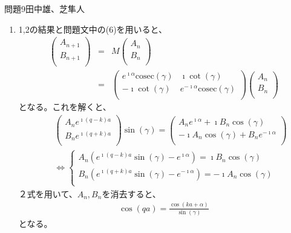 \documentclass[fleqn]{jbook}
\begin{document}
\begin{answer}{問題9}{田中雄、芝隼人}
\begin{enumerate}
\item
1,2の結果と問題文中の(6)を用いると、
\begin{eqnarray}
\left(
  \begin{array}{c}
    A_{n+1}   \\
    B_{n+1}   \\
  \end{array}
\right)
&=&M
\left(
  \begin{array}{c}
    A_{n}   \\
    B_{n}   \\
  \end{array}
\right)\\
&=&
\left(
  \begin{array}{cc}
    e^{\imath \alpha }\textrm{cosec} (\gamma )   & \imath \cot (\gamma )   \\
    -\imath \cot (\gamma )   & e^{-\imath \alpha }\textrm{cosec} (\gamma )   \\
  \end{array}
\right)
\left(
  \begin{array}{c}
    A_{n}   \\
    B_{n}   \\
  \end{array}
\right)
\end{eqnarray}
となる。これを解くと、
\begin{eqnarray}
&& \left(
  \begin{array}{c}
    A_{n}e^{\imath (q-k)a}   \\
    B_{n}e^{\imath (q+k)a}   \\
  \end{array}
\right)\sin(\gamma)
=
\left(
  \begin{array}{c}
    A_{n}e^{\imath \alpha}+\imath B_{n}\cos (\gamma)    \\
    -\imath A_{n}\cos (\gamma)+B_{n}e^{-\imath \alpha}  \\
  \end{array}
\right)\\
&& \Leftrightarrow  \left\{
  \begin{array}{c}
    A_{n}(e^{\imath (q-k)a}\sin (\gamma)-e^{\imath \alpha})=\imath B_{n}\cos (\gamma)   \\
    B_{n}(e^{\imath (q+k)a}\sin (\gamma)-e^{-\imath \alpha})=-\imath A_{n}\cos (\gamma)   \\
  \end{array}
\right.
\end{eqnarray}
２式を用いて、$A_{n},B_{n}$を消去すると、
\begin{eqnarray}
\cos (qa)=\frac{\cos (ka+\alpha )}{\sin (\gamma)}
\end{eqnarray}
となる。\\


\end{enumerate}
\end{answer}
\end{document}
